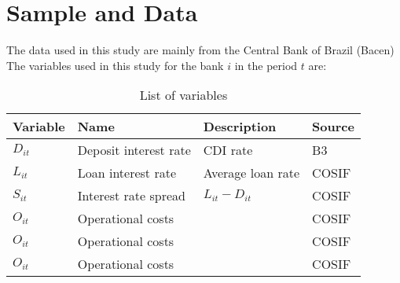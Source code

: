 \chapter{Sample and Data}

The data used in this study are mainly from the Central Bank of Brazil (Bacen) 
The variables used in this study for the bank $i$ in the period $t$ are:

\begin{table}[h!]
\centering
\begin{tabular}{ p{1.5cm} p{4cm} p{6cm} p{3cm}  }
\hline
Variable & Name & Description & Source \\ [0.5ex] 
\hline\hline
$D_{it}$ & Deposit interest rate & CDI rate & B3 \\
$L_{it}$ & Loan interest rate & Average loan rate & COSIF \\
$S_{it}$ & Interest rate spread & $L_{it} - D_{it}$ & COSIF \\ 
$O_{it}$ & Operational costs &  & COSIF \\
$O_{it}$ & Operational costs &  & COSIF \\
$O_{it}$ & Operational costs &  & COSIF \\ 
[1ex] 
\hline
\end{tabular}
\caption{List of variables}
\label{table:1}
\end{table}